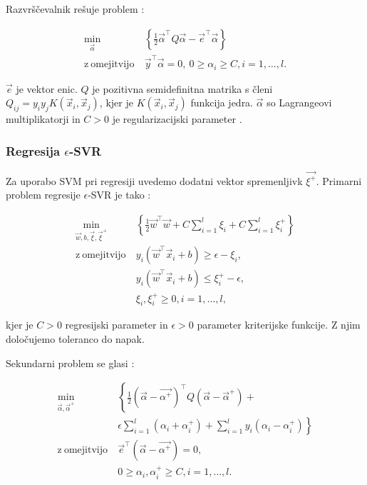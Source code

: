 {Razvrščevalnik rešuje problem \cite{chang2011a}:

\begin{equation}\label{eq:c-svc}
\begin{aligned}
\min_{\vec{\alpha}} &~ \left\{ \frac{1}{2} \vec{\alpha}^\top Q \vec{\alpha} - \vec{e}^\top \vec{\alpha} \right\}\\
    \mathrm{z~omejitvijo} &~ \vec{y}^\top \vec{\alpha} = 0,~ 
    0 \geq \alpha_i \geq C, i=1, \ldots, l.
\end{aligned}	
\end{equation}

$\vec{e}$ je vektor enic. $Q$ je pozitivna semidefinitna matrika s členi $Q_{ij} = y_i y_jK(\vec{x}_i,\vec{x}_j)$, kjer je $K(\vec{x}_i,\vec{x}_j)$ funkcija jedra. $\vec{\alpha}$ so Lagrangeovi multiplikatorji in $C>0$ je regularizacijski parameter \cite{chang2011a}.








\subsubsection{Regresija \texorpdfstring{$\epsilon$}{e}-SVR}

Za uporabo SVM pri regresiji uvedemo dodatni vektor spremenljivk $\vec{\xi^+}$. Primarni problem regresije $\epsilon$-SVR je  tako \cite{chang2011a}:

\begin{equation}\label{eq:e-svr-primal}
\begin{aligned}
\min_{\vec{w}, b, \vec{\xi}, \vec{\xi}^+} &~ \left\{ \frac{1}{2} \vec{w}^\top\vec{w} + C \sum_{i=1}^l\xi_i + C \sum_{i=1}^l\xi_i^+ \right\}\\
    \mathrm{z~omejitvijo} &~ y_i \left( \vec{w}^\top \vec{x}_i + b \right) \geq \epsilon - \xi_i,\\
    &~  y_i \left( \vec{w}^\top \vec{x}_i + b \right) \leq \xi_i^+ - \epsilon, \\
    &~  \xi_i,\xi_i^+ \geq 0, i=1, \ldots, l,
\end{aligned}	
\end{equation}

kjer je $C>0$ regresijski parameter in $\epsilon > 0$ parameter kriterijske funkcije. Z njim določujemo toleranco do napak.

Sekundarni problem se glasi \cite{chang2011a}:

\begin{equation}\label{eq:e-svr-dual}
\begin{aligned}
\min_{\vec{\alpha}, \vec{\alpha}^+} &~ \left\{ \frac{1}{2} (\vec{\alpha} - \vec{\alpha^ +})^\top Q (\vec{\alpha} - \vec{\alpha}^+) +\right. \\
&~ \left.\epsilon \sum_{i=1}^l\left( \alpha_i + \alpha_i^+ \right) + \sum_{i=1}^l y_i\left( \alpha_i - \alpha_i^+ \right) \right\}\\
    \mathrm{z~omejitvijo} &~ 
    \vec{e}^\top \left(\vec{\alpha} - \vec{\alpha^+} \right) = 0,\\
    &~ 0 \geq \alpha_i, \alpha_i^+ \geq C, i=1, \ldots, l.
\end{aligned}	
\end{equation}

}
